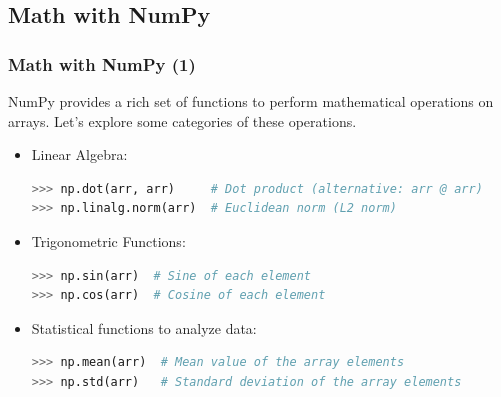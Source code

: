 \subsection{Math with NumPy}
\begin{frame}[fragile]
  \frametitle{Math with NumPy (1)}
  NumPy provides a rich set of functions to perform mathematical operations on arrays. Let's explore some categories of these operations.
  \begin{itemize}
    \item Linear Algebra:
    \begin{lstlisting}[language=Python, numbers=none]
>>> np.dot(arr, arr)     # Dot product (alternative: arr @ arr)
>>> np.linalg.norm(arr)  # Euclidean norm (L2 norm)
    \end{lstlisting}\pause
    
    \item Trigonometric Functions:
  \begin{lstlisting}[language=Python, numbers=none]
>>> np.sin(arr)  # Sine of each element
>>> np.cos(arr)  # Cosine of each element
  \end{lstlisting}
  
  \item Statistical functions to analyze data:
  \begin{lstlisting}[language=Python, numbers=none]
>>> np.mean(arr)  # Mean value of the array elements
>>> np.std(arr)   # Standard deviation of the array elements
  \end{lstlisting}
\end{itemize}
\end{frame}


